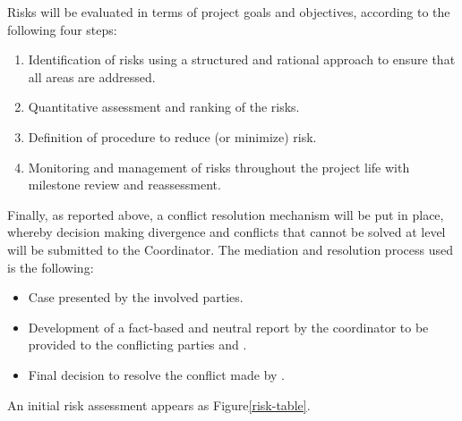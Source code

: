 Risks will be evaluated in terms of project goals and objectives,
according to the following four steps:
\begin{enumerate}
\item Identification of risks using a structured and rational approach to
ensure that all areas are addressed.
\item Quantitative assessment and ranking of the risks.
\item Definition of procedure to reduce (or minimize) risk.
\item Monitoring and management of risks throughout the project life
with milestone review and reassessment.
\end{enumerate}

Finally, as reported above, a conflict resolution mechanism will be put in place,
whereby decision making divergence and conflicts that cannot be solved
at  level will be submitted to the Coordinator. The
mediation and resolution process used is the following:
\begin{itemize}
\item Case presented by the involved parties.
\item Development of a fact-based and neutral report by the coordinator
to be provided to the conflicting parties and .
\item Final decision to resolve the conflict made by .
\end{itemize}

\ifgrantagreement\else
An initial risk assessment appears as Figure\ref{risk-table}.


